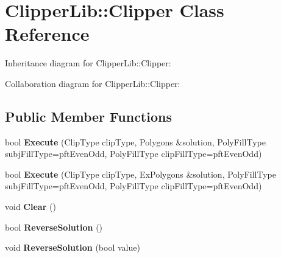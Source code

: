 \hypertarget{class_clipper_lib_1_1_clipper}{\section{Clipper\+Lib\+:\+:Clipper Class Reference}
\label{class_clipper_lib_1_1_clipper}
}


Inheritance diagram for Clipper\+Lib\+:\+:Clipper\+:


Collaboration diagram for Clipper\+Lib\+:\+:Clipper\+:
\subsection*{Public Member Functions}
\begin{DoxyCompactItemize}
\item 
\hypertarget{class_clipper_lib_1_1_clipper_a674d5d300c73a4da99bc36a7ecde0618}{bool {\bfseries Execute} (Clip\+Type clip\+Type, Polygons \&solution, Poly\+Fill\+Type subj\+Fill\+Type=pft\+Even\+Odd, Poly\+Fill\+Type clip\+Fill\+Type=pft\+Even\+Odd)}\label{class_clipper_lib_1_1_clipper_a674d5d300c73a4da99bc36a7ecde0618}

\item 
\hypertarget{class_clipper_lib_1_1_clipper_adf984f1b3b84a3f4e859f5820caa3aea}{bool {\bfseries Execute} (Clip\+Type clip\+Type, Ex\+Polygons \&solution, Poly\+Fill\+Type subj\+Fill\+Type=pft\+Even\+Odd, Poly\+Fill\+Type clip\+Fill\+Type=pft\+Even\+Odd)}\label{class_clipper_lib_1_1_clipper_adf984f1b3b84a3f4e859f5820caa3aea}

\item 
\hypertarget{class_clipper_lib_1_1_clipper_a4f4576bad48bce34a36e6806623abd7a}{void {\bfseries Clear} ()}\label{class_clipper_lib_1_1_clipper_a4f4576bad48bce34a36e6806623abd7a}

\item 
\hypertarget{class_clipper_lib_1_1_clipper_ad556ba9961f498de02d55dc95bc5a889}{bool {\bfseries Reverse\+Solution} ()}\label{class_clipper_lib_1_1_clipper_ad556ba9961f498de02d55dc95bc5a889}

\item 
\hypertarget{class_clipper_lib_1_1_clipper_a44afc0c82a1d2607829b5fd21f7644ef}{void {\bfseries Reverse\+Solution} (bool value)}\label{class_clipper_lib_1_1_clipper_a44afc0c82a1d2607829b5fd21f7644ef}

\end{DoxyCompactItemize}
